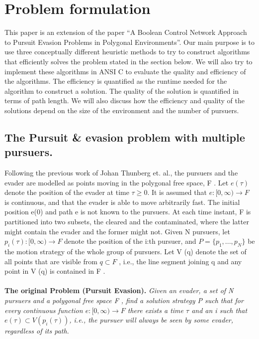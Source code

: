 \chapter{Problem formulation}

This paper is an extension of the paper ``A Boolean Control Network Approach to Pursuit Evasion Problems in Polygonal Environments''\cite{paper1}. Our main purpose is to use three conceptually different heuristic methods to try to construct algorithms that efficiently solves the problem stated in the section below. We will also try to implement these algorithms in ANSI C to evaluate the quality and efficiency of the algorithms. The efficiency is quantified as the runtime needed for the algorithm to construct a solution. The quality of the solution is quantified in terms of path length. We will also discuss how the efficiency and quality of the solutions depend on the size of the environment and the number of pursuers.
\section {The Pursuit \& evasion problem with multiple pursuers.}
Following the previous work of Johan Thunberg  et. al.\cite{paper1}, the pursuers and the evader are modelled as points moving in the polygonal free space, F . Let  $e(\tau )$ denote the position of the evader at time $\tau \geq 0$. It is assumed that $e : \lbrack 0, \infty) \to F$ is continuous, and that the evader is able to move arbitrarily fast. The initial position e(0) and path e is not known to the pursuers. At each time instant, F is partitioned into two subsets, the cleared and the contaminated, where the latter might contain the evader and the former might not. Given N pursuers, let $p_i (\tau ) : \lbrack 0, \infty) \to F$ denote the position of the i:th pursuer, and $P = \lbrace p_1 , . . . , p_N \rbrace$ be the motion strategy of the whole group of pursuers. Let V (q) denote the set of all points that are visible from $q \subset F$ , i.e., the line segment joining q and any point in V (q) is contained in F .\\
\\
\textbf{The original Problem (Pursuit Evasion).} \emph{ Given an evader, a set of N pursuers and a polygonal free space F , find a solution strategy P such that for every continuous function $e : \lbrack 0, \infty) \to F$ there exists a time $\tau$ and an i such that $e(\tau ) \subset V (p_i (\tau ))$, i.e., the pursuer will always be seen by some evader, regardless of its path. }

